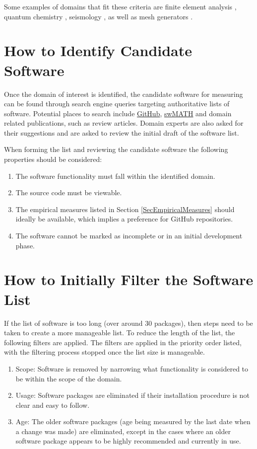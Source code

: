 \documentclass[letterpaper,cleveref]{lipics-v2019}
\theoremstyle{definition}
\begin{document}
Some examples of domains that fit these criteria are finite element analysis
\citep{szabo1996finite}, quantum chemistry \citep{veryazov20042molcas},
seismology \citep{SmithEtAl2018}, as well as mesh generators
\citep{smith2016state}.

\section{How to Identify Candidate Software} \label{SecIdentifyCandSoft}

Once the domain of interest is identified, the candidate software for measuring
can be found through search engine queries targeting authoritative lists of
software.  Potential places to search include \href{https://github.com/}
{GitHub}, \href{https://swmath.org/} {swMATH} and domain related publications,
such as review articles. Domain experts are also asked for their suggestions and
are asked to review the initial draft of the software list.  

When forming the list and reviewing the candidate software the following
properties should be considered:

\begin{enumerate}
\item The software functionality must fall within the identified domain.
\item The source code must be viewable.
\item The empirical measures listed in Section \ref{SecEmpiricalMeasures} should
  ideally be available, which implies a preference for GitHub repositories.
\item The software cannot be marked as incomplete or in an initial development
  phase.
\end{enumerate}

\section{How to Initially Filter the Software List} \label{SecInitialFilter}

If the list of software is too long (over around 30 packages), then steps need
to be taken to create a more manageable list. To reduce the length of the list,
the following filters are applied.  The filters are applied in the priority
order listed, with the filtering process stopped once the list size is
manageable.

\begin{enumerate}
\item Scope: Software is removed by narrowing what functionality is considered
  to be within the scope of the domain.
\item Usage: Software packages are eliminated if their installation procedure is
  not clear and easy to follow.
\item Age: The older software packages (age being measured by the last date when
  a change was made) are eliminated, except in the cases where an older software
  package appears to be highly recommended and currently in use.
\end{enumerate}
\end{document}
